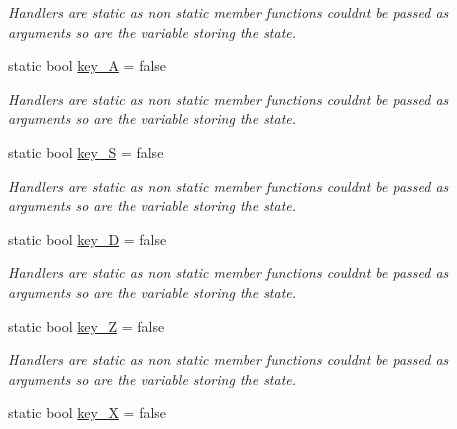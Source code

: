 \begin{DoxyCompactItemize}
\begin{DoxyCompactList}\small\item\em Handlers are static as non static member functions couldn\textquotesingle{}t be passed as arguments so are the variable storing the state. \end{DoxyCompactList}\item 
static bool \hyperlink{classcft_1_1Crafter_a5d9a03f72de437086e9beb2dffd39cca}{key\+\_\+A} = false\hypertarget{classcft_1_1Crafter_a5d9a03f72de437086e9beb2dffd39cca}{}\label{classcft_1_1Crafter_a5d9a03f72de437086e9beb2dffd39cca}

\begin{DoxyCompactList}\small\item\em Handlers are static as non static member functions couldn\textquotesingle{}t be passed as arguments so are the variable storing the state. \end{DoxyCompactList}\item 
static bool \hyperlink{classcft_1_1Crafter_ae8d219172097605d7511564e6a7c4236}{key\+\_\+S} = false\hypertarget{classcft_1_1Crafter_ae8d219172097605d7511564e6a7c4236}{}\label{classcft_1_1Crafter_ae8d219172097605d7511564e6a7c4236}

\begin{DoxyCompactList}\small\item\em Handlers are static as non static member functions couldn\textquotesingle{}t be passed as arguments so are the variable storing the state. \end{DoxyCompactList}\item 
static bool \hyperlink{classcft_1_1Crafter_a1b25b4753e092c47dd1557d4583caaa9}{key\+\_\+D} = false\hypertarget{classcft_1_1Crafter_a1b25b4753e092c47dd1557d4583caaa9}{}\label{classcft_1_1Crafter_a1b25b4753e092c47dd1557d4583caaa9}

\begin{DoxyCompactList}\small\item\em Handlers are static as non static member functions couldn\textquotesingle{}t be passed as arguments so are the variable storing the state. \end{DoxyCompactList}\item 
static bool \hyperlink{classcft_1_1Crafter_aa2c40e67f2e7267a1e250b33102034b7}{key\+\_\+Z} = false\hypertarget{classcft_1_1Crafter_aa2c40e67f2e7267a1e250b33102034b7}{}\label{classcft_1_1Crafter_aa2c40e67f2e7267a1e250b33102034b7}

\begin{DoxyCompactList}\small\item\em Handlers are static as non static member functions couldn\textquotesingle{}t be passed as arguments so are the variable storing the state. \end{DoxyCompactList}\item 
static bool \hyperlink{classcft_1_1Crafter_a89c9924a417a474455da1e5d0b6ac9ce}{key\+\_\+X} = false\hypertarget{classcft_1_1Crafter_a89c9924a417a474455da1e5d0b6ac9ce}{}\label{classcft_1_1Crafter_a89c9924a417a474455da1e5d0b6ac9ce}


\end{DoxyCompactItemize}
